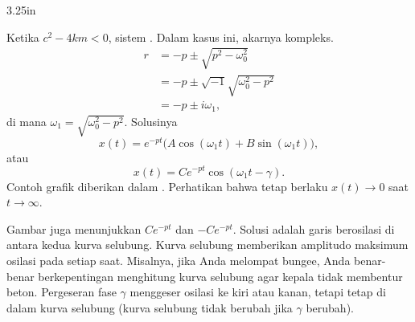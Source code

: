 \begin{mywrapfig}[13]{3.25in}
\capstart
{}
\caption{Gerak teredam kurang dengan kurva selubung ditampilkan.\label{mv:underdampedfig}}
\end{mywrapfig}
%
%
Ketika $c^2 - 4km < 0$, sistem \emph{}. Dalam kasus ini, akarnya kompleks.
\begin{equation*}
\begin{split}
r & = -p \pm \sqrt{p^2 - \omega_0^2} \\
& = -p \pm \sqrt{-1}\sqrt{\omega_0^2 - p^2} \\
& = -p \pm i \omega_1 ,
\end{split}
\end{equation*}
di mana $\omega_1 =\sqrt{\omega_0^2 - p^2}$. Solusinya
\begin{equation*}
x(t) = e^{-pt} \bigl( A \cos (\omega_1 t) + B \sin (\omega_1 t) \bigr) ,
\end{equation*}
atau
\begin{equation*}
x(t) = C e^{-pt} \cos ( \omega_1 t - \gamma ) .
\end{equation*}
Contoh grafik diberikan dalam . Perhatikan bahwa tetap berlaku $x(t) \to 0$ saat $t \to \infty$.


Gambar juga menunjukkan \emph{} $C e^{-pt}$ dan $-C e^{-pt}$. Solusi adalah garis berosilasi di antara kedua kurva selubung. Kurva selubung memberikan amplitudo maksimum osilasi pada setiap saat. Misalnya, jika Anda melompat bungee, Anda benar-benar berkepentingan menghitung kurva selubung agar kepala tidak membentur beton.
%
Pergeseran fase $\gamma$ menggeser osilasi ke kiri atau kanan, tetapi tetap di dalam kurva selubung (kurva selubung tidak berubah jika $\gamma$ berubah).

